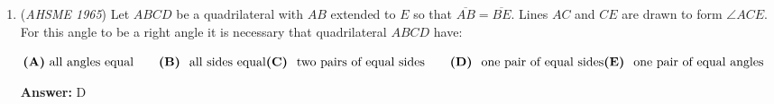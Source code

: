 \begin{enumerate}
 $\textbf{(A)}\ 7 \qquad  \textbf{(B) }\ 8 \qquad  \textbf{(C) }\ 9 \qquad  \textbf{(D) }\ 10 \qquad  \textbf{(E) }\ 11$

 \textbf{Answer: }E



\textbf{Solution}

Note that the given sequence is a \href{https://artofproblemsolving.com/wiki/index.php?title=Geometric\_sequence}{geometric sequence} with a common ratio $10^{\frac{1}{11}}$. Let the product of the first $n$ terms of the sequence be denoted $P_n$. It is a consequence of the laws of exponents that $P_1=(10^{\frac{1}{11}})^1$, $P_2=(10^{\frac{1}{11}})^{1+2}$, and, in general, $P_n=(10^{\frac{1}{11}})^{T_n}$, where $T_n$ denotes the $n$th \href{https://artofproblemsolving.com/wiki/index.php?title=Triangular\_number}{triangular number}. Setting $P_n$ equal to $100,000$, we see that:\begin{align*} \\(10^{\frac{1}{11}})^{\frac{n(n+1)}{2}}&=10^5 \\\frac{1}{11}*\frac{n(n+1)}{2}&=5 \\n(n+1)&=110 \\n^2+n-110&=0 \\(n-10)(n+11)&=0 \\\end{align*}
Because $n$ must be positive, we are left with $n=10$. Given this information, choice (D) may seem appealing. Do not be fooled. The product of the first $n$ terms is \textit{exactly} $100,000$, but the problem asks for the smallest $n$ such that $P_n$ \textit{exceeds} 100,000. Thus, the minimum value of $n$ which satsifies the problem is $\boxed{\textbf{(E) }11}$.

 


	\item (\textit{AHSME 1965}) Let $ABCD$ be a quadrilateral with $AB$ extended to $E$ so that $\overline{AB} = \overline{BE}$. 
Lines $AC$ and $CE$ are drawn to form $\angle{ACE}$. For this angle to be a right angle it is necessary that quadrilateral $ABCD$ have: 


 $\textbf{(A)}\ \text{all angles equal} \qquad \textbf{(B) }\ \text{all sides equal} \\ \textbf{(C) }\ \text{two pairs of equal sides} \qquad \textbf{(D) }\ \text{one pair of equal sides} \\ \textbf{(E) }\ \text{one pair of equal angles}$

 \textbf{Answer: }D




\end{enumerate}
